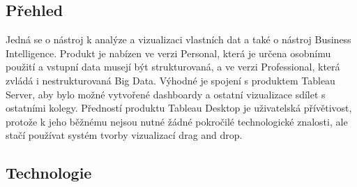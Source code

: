\documentclass[czech,BP]{thesiskiv}
\begin{document}
 \subsection{Přehled}
 Jedná se o nástroj k analýze a vizualizaci vlastních dat a také o nástroj Business Intelligence. Produkt je nabízen ve verzi Personal, která je určena osobnímu použití a vstupní data musejí být strukturovaná, a ve verzi Professional, která zvládá i nestrukturovaná Big Data. Výhodné je spojení s produktem Tableau Server, aby bylo možné vytvořené dashboardy a ostatní vizualizace sdílet s ostatními kolegy. Předností produktu Tableau Desktop je uživatelská přívětivost, protože k jeho běžnému nejsou nutné žádné pokročilé technologické znalosti, ale stačí používat systém tvorby vizualizací drag and drop. 
 
 \subsection{Technologie}
 
\end{document}
